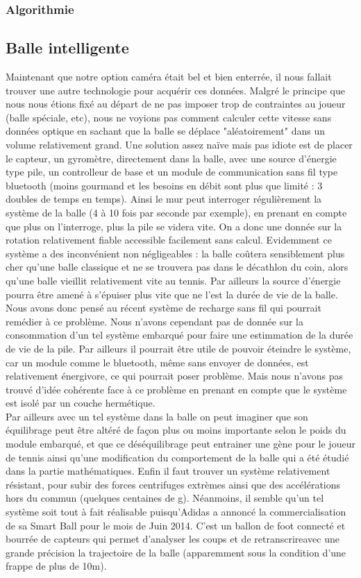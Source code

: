 \subsubsection{Algorithmie}


\subsection{Balle intelligente}

Maintenant que notre option caméra était bel et bien enterrée, il nous fallait trouver une autre technologie pour acquérir ces données. Malgré le principe que nous nous étions fixé au départ de ne pas imposer trop de contraintes au joueur (balle spéciale, etc), nous ne voyions pas comment calculer cette vitesse sans données optique en sachant que la balle se déplace "aléatoirement" dans un volume relativement grand. Une solution assez naïve mais pas idiote est de placer le capteur, un gyromètre, directement dans la balle, avec une source d'énergie type pile, un controlleur de base et un module de communication sans fil type bluetooth (moins gourmand et les besoins en débit sont plus que limité : 3 doubles de temps en temps). Ainsi le mur peut interroger régulièrement la système de la balle (4 à 10 fois par seconde par exemple), en prenant en compte que plus on l'interroge, plus la pile se videra vite. On a donc une donnée sur la rotation relativement fiable accessible facilement sans calcul. Evidemment ce système a des inconvénient non négligeables : la balle coûtera sensiblement plus cher qu'une balle classique et ne se trouvera pas dans le décathlon du coin, alors qu'une balle vieillit relativement vite au tennis. Par ailleurs la source d'énergie pourra être amené à s'épuiser plus vite que ne l'est la durée de vie de la balle. Nous avons donc pensé au récent système de recharge sans fil qui pourrait remédier à ce problème. Nous n'avons cependant pas de donnée sur la consommation d'un tel système embarqué pour faire une estimmation de la durée de vie de la pile. Par ailleurs il pourrait être utile de pouvoir éteindre le système, car un module comme le bluetooth, même sans envoyer de données, est relativement énergivore, ce qui pourrait poser problème. Mais nous n'avons pas trouvé d'idée cohérente face à ce problème en prenant en compte que le système est isolé par un couche hermétique. \\

Par ailleurs avec un tel système dans la balle on peut imaginer que son équilibrage peut être altéré de façon plus ou moins importante selon le poids du module embarqué, et que ce déséquilibrage peut entrainer une gène pour le joueur de tennis ainsi qu'une modification du comportement de la balle qui a été étudié dans la partie mathématiques. Enfin il faut trouver un système relativement résistant, pour subir des forces centrifuges extrèmes ainsi que des accélérations hors du commun (quelques centaines de g). Néanmoins, il semble qu'un tel système soit tout à fait réalisable puisqu'Adidas a annoncé la commercialisation de sa Smart Ball pour le mois de Juin 2014. C'est un ballon de foot connecté et bourrée de capteurs qui permet d'analyser les coups et de retranscrireavec une grande précision la trajectoire de la balle (apparemment sous la condition d'une frappe de plus de 10m). 

